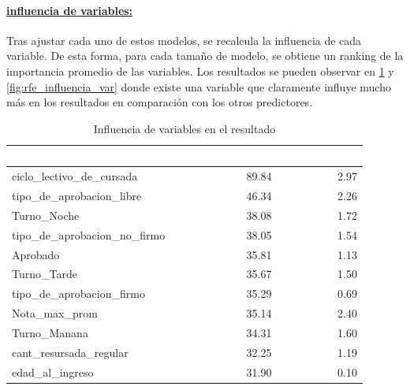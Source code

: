 \paragraph{\underline{influencia de variables:}}
Tras ajustar cada uno de estos modelos, se recalcula la influencia de cada variable. De esta forma, para cada tamaño de modelo, se obtiene un ranking de la importancia promedio de las variables. Los resultados se pueden observar en \ref{tab:tf_rfe_influencia_variables} y \ref{fig:rfe_influencia_var} donde existe una variable que claramente influye mucho más en los resultados en comparación con los otros predictores.

\begin{table}[!h]
	
	\caption{\label{tab:tf_rfe_influencia_variables}Influencia de variables en el resultado}
	\centering
	\begin{tabular}[t]{lrr}
		\toprule
		\rowcolor{black}  \multicolumn{1}{c}{\textcolor{white}{\textbf{var}}} & \multicolumn{1}{c}{\textcolor{white}{\textbf{media\_influencia}}} & \multicolumn{1}{c}{\textcolor{white}{\textbf{sd\_influencia}}}\\
		\midrule
		\rowcolor{gray!6}  ciclo\_lectivo\_de\_cursada & 89.84 & 2.97\\
		tipo\_de\_aprobacion\_libre & 46.34 & 2.26\\
		\rowcolor{gray!6}  Turno\_Noche & 38.08 & 1.72\\
		tipo\_de\_aprobacion\_no\_firmo & 38.05 & 1.54\\
		\rowcolor{gray!6}  Aprobado & 35.81 & 1.13\\
		\addlinespace
		Turno\_Tarde & 35.67 & 1.50\\
		\rowcolor{gray!6}  tipo\_de\_aprobacion\_firmo & 35.29 & 0.69\\
		Nota\_max\_prom & 35.14 & 2.40\\
		\rowcolor{gray!6}  Turno\_Manana & 34.31 & 1.60\\
		cant\_resursada\_regular & 32.25 & 1.19\\
		\addlinespace
		\rowcolor{gray!6}  edad\_al\_ingreso & 31.90 & 0.10\\
		\bottomrule
	\end{tabular}
\end{table}

\FloatBarrier

